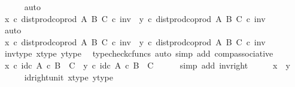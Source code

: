 \begin{isabellebody}
\ \ \ \ \isamarkupfalse%
\ auto\isanewline
\ \ \isamarkupfalse%
\ \isamarkupfalse%
\ {\isachardoublequoteopen}{\isacharparenleft}{\kern0pt}x\ {\isasymcirc}\isactrlsub c\ dist{\isacharunderscore}{\kern0pt}prod{\isacharunderscore}{\kern0pt}coprod\ A\ B\ C{\isacharparenright}{\kern0pt}\ {\isasymcirc}\isactrlsub c\ inv\ {\isacharequal}{\kern0pt}\ {\isacharparenleft}{\kern0pt}y\ {\isasymcirc}\isactrlsub c\ dist{\isacharunderscore}{\kern0pt}prod{\isacharunderscore}{\kern0pt}coprod\ A\ B\ C{\isacharparenright}{\kern0pt}\ {\isasymcirc}\isactrlsub c\ inv{\isachardoublequoteclose}\isanewline
\ \ \ \ \isamarkupfalse%
\ auto\isanewline
\ \ \isamarkupfalse%
\ \isamarkupfalse%
\ {\isachardoublequoteopen}x\ {\isasymcirc}\isactrlsub c\ dist{\isacharunderscore}{\kern0pt}prod{\isacharunderscore}{\kern0pt}coprod\ A\ B\ C\ {\isasymcirc}\isactrlsub c\ inv\ {\isacharequal}{\kern0pt}\ y\ {\isasymcirc}\isactrlsub c\ dist{\isacharunderscore}{\kern0pt}prod{\isacharunderscore}{\kern0pt}coprod\ A\ B\ C\ {\isasymcirc}\isactrlsub c\ inv{\isachardoublequoteclose}\isanewline
\ \ \ \ \isamarkupfalse%
\ inv{\isacharunderscore}{\kern0pt}type\ x{\isacharunderscore}{\kern0pt}type\ y{\isacharunderscore}{\kern0pt}type\ \isamarkupfalse%
\ {\isacharparenleft}{\kern0pt}typecheck{\isacharunderscore}{\kern0pt}cfuncs{\isacharcomma}{\kern0pt}\ auto\ simp\ add{\isacharcolon}{\kern0pt}\ comp{\isacharunderscore}{\kern0pt}associative{}{\isacharparenright}{\kern0pt}\isanewline
\ \ \isamarkupfalse%
\ \isamarkupfalse%
\ {\isachardoublequoteopen}x\ {\isasymcirc}\isactrlsub c\ id\isactrlsub c\ {\isacharparenleft}{\kern0pt}A\ {\isasymtimes}\isactrlsub c\ B\ {\isasymCoprod}\ C{\isacharparenright}{\kern0pt}\ {\isacharequal}{\kern0pt}\ y\ {\isasymcirc}\isactrlsub c\ id\isactrlsub c\ {\isacharparenleft}{\kern0pt}A\ {\isasymtimes}\isactrlsub c\ B\ {\isasymCoprod}\ C{\isacharparenright}{\kern0pt}{\isachardoublequoteclose}\isanewline
\ \ \ \ \isamarkupfalse%
\ {\isacharparenleft}{\kern0pt}simp\ add{\isacharcolon}{\kern0pt}\ inv{\isacharunderscore}{\kern0pt}right{\isacharparenright}{\kern0pt}\isanewline
\ \ \isamarkupfalse%
\ \isamarkupfalse%
\ {\isachardoublequoteopen}x\ {\isacharequal}{\kern0pt}\ y{\isachardoublequoteclose}\isanewline
\ \ \ \ \isamarkupfalse%
\ id{\isacharunderscore}{\kern0pt}right{\isacharunderscore}{\kern0pt}unit{}\ x{\isacharunderscore}{\kern0pt}type\ y{\isacharunderscore}{\kern0pt}type\ \isamarkupfalse%

\end{isabellebody}

